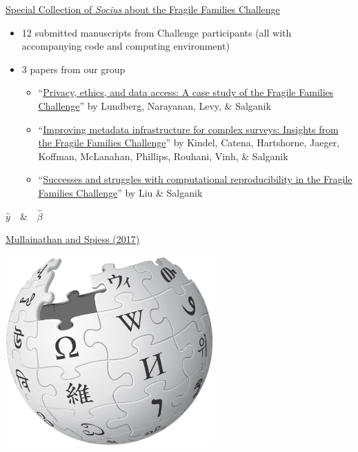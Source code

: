 \documentclass[aspectratio=169]{beamer}
\begin{document}
\begin{frame}

\href{https://journals.sagepub.com/topic/collections-srd/srd-1-fragile_families/srd}{Special Collection of \textit{Socius} about the Fragile Families Challenge}
\begin{itemize}
\item 12 submitted manuscripts from Challenge participants (all with accompanying code and computing environment) \pause
\item 3 papers from our group \pause
\begin{itemize}
\item ``\href{https://doi.org/10.1177/2378023118813023}{Privacy, ethics, and data access: A case study of the Fragile Families Challenge}'' by Lundberg, Narayanan, Levy, \& Salganik \pause
\item ``\href{https://doi.org/10.1177/2378023118817378}{Improving metadata infrastructure for complex surveys: Insights from the Fragile Families Challenge}'' by Kindel, Catena, Hartshorne, Jaeger, Koffman, McLanahan, Phillips, Rouhani, Vinh, \& Salganik \pause
\item ``\href{https://doi.org/10.1177/2378023119849803}{Successes and struggles with computational reproducibility in the Fragile Families Challenge}'' by Liu \& Salganik
\end{itemize}
\end{itemize}

\end{frame}
\begin{frame}

\begin{center}
\LARGE{
$ \hat{y} \quad \& \quad \hat{\beta}$
}
\end{center}

\vfill
\href{https://dx.doi.org/10.1257/jep.31.2.87}{Mullainathan and Spiess (2017)}
\end{frame}
\begin{frame}

\begin{center}
\includegraphics[width=0.6\textwidth]{figures/wikipedia_logo}
\end{center}

\end{frame}
\end{document}
